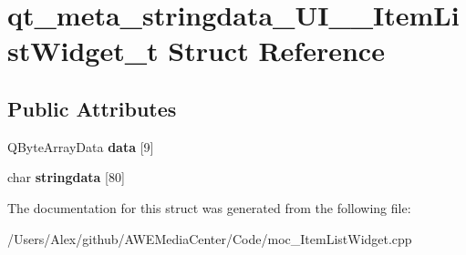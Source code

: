 \hypertarget{structqt__meta__stringdata___u_i_____item_list_widget__t}{\section{qt\-\_\-meta\-\_\-stringdata\-\_\-\-U\-I\-\_\-\-\_\-\-Item\-List\-Widget\-\_\-t Struct Reference}
\label{structqt__meta__stringdata___u_i_____item_list_widget__t}
}
\subsection*{Public Attributes}
\begin{DoxyCompactItemize}
\item 
\hypertarget{structqt__meta__stringdata___u_i_____item_list_widget__t_a51b4e155ddd8fe41b2dcb7d7797a00be}{Q\-Byte\-Array\-Data {\bfseries data} \mbox{[}9\mbox{]}}\label{structqt__meta__stringdata___u_i_____item_list_widget__t_a51b4e155ddd8fe41b2dcb7d7797a00be}

\item 
\hypertarget{structqt__meta__stringdata___u_i_____item_list_widget__t_ab4ad0c7c4afe3b1b606b4516583f4d1f}{char {\bfseries stringdata} \mbox{[}80\mbox{]}}\label{structqt__meta__stringdata___u_i_____item_list_widget__t_ab4ad0c7c4afe3b1b606b4516583f4d1f}

\end{DoxyCompactItemize}


The documentation for this struct was generated from the following file\-:\begin{DoxyCompactItemize}
\item 
/\-Users/\-Alex/github/\-A\-W\-E\-Media\-Center/\-Code/moc\-\_\-\-Item\-List\-Widget.\-cpp\end{DoxyCompactItemize}
